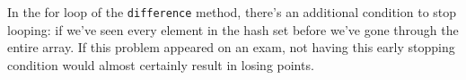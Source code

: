 \documentclass[12pt,letter]{article}
\begin{document}
\noindent In the for loop of the \texttt{difference} method, there's an additional condition to stop looping: if we've seen every 
element in the hash set before we've gone through the entire array. If this problem appeared on an exam, not having this early
stopping condition would almost certainly result in losing points.
\end{document}
